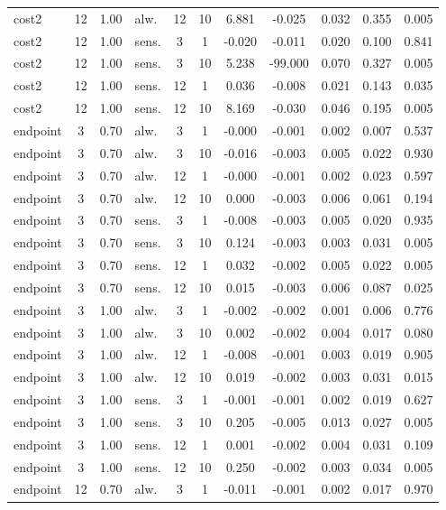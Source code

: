 \documentclass[10pt]{article}
\begin{document}
\begin{scriptsize}
\begin{longtable}{l cclcc ccccc}
cost2 & 12 & 1.00 & alw. & 12 & 10 & 6.881 & -0.025 & 0.032 & 0.355 & 0.005 \\
cost2 & 12 & 1.00 & sens. & 3 & 1 & -0.020 & -0.011 & 0.020 & 0.100 & 0.841 \\
cost2 & 12 & 1.00 & sens. & 3 & 10 & 5.238 & -99.000 & 0.070 & 0.327 & 0.005 \\
cost2 & 12 & 1.00 & sens. & 12 & 1 & 0.036 & -0.008 & 0.021 & 0.143 & 0.035 \\
cost2 & 12 & 1.00 & sens. & 12 & 10 & 8.169 & -0.030 & 0.046 & 0.195 & 0.005 \\
endpoint & 3 & 0.70 & alw. & 3 & 1 & -0.000 & -0.001 & 0.002 & 0.007 & 0.537 \\
endpoint & 3 & 0.70 & alw. & 3 & 10 & -0.016 & -0.003 & 0.005 & 0.022 & 0.930 \\
endpoint & 3 & 0.70 & alw. & 12 & 1 & -0.000 & -0.001 & 0.002 & 0.023 & 0.597 \\
endpoint & 3 & 0.70 & alw. & 12 & 10 & 0.000 & -0.003 & 0.006 & 0.061 & 0.194 \\
endpoint & 3 & 0.70 & sens. & 3 & 1 & -0.008 & -0.003 & 0.005 & 0.020 & 0.935 \\
endpoint & 3 & 0.70 & sens. & 3 & 10 & 0.124 & -0.003 & 0.003 & 0.031 & 0.005 \\
endpoint & 3 & 0.70 & sens. & 12 & 1 & 0.032 & -0.002 & 0.005 & 0.022 & 0.005 \\
endpoint & 3 & 0.70 & sens. & 12 & 10 & 0.015 & -0.003 & 0.006 & 0.087 & 0.025 \\
endpoint & 3 & 1.00 & alw. & 3 & 1 & -0.002 & -0.002 & 0.001 & 0.006 & 0.776 \\
endpoint & 3 & 1.00 & alw. & 3 & 10 & 0.002 & -0.002 & 0.004 & 0.017 & 0.080 \\
endpoint & 3 & 1.00 & alw. & 12 & 1 & -0.008 & -0.001 & 0.003 & 0.019 & 0.905 \\
endpoint & 3 & 1.00 & alw. & 12 & 10 & 0.019 & -0.002 & 0.003 & 0.031 & 0.015 \\
endpoint & 3 & 1.00 & sens. & 3 & 1 & -0.001 & -0.001 & 0.002 & 0.019 & 0.627 \\
endpoint & 3 & 1.00 & sens. & 3 & 10 & 0.205 & -0.005 & 0.013 & 0.027 & 0.005 \\
endpoint & 3 & 1.00 & sens. & 12 & 1 & 0.001 & -0.002 & 0.004 & 0.031 & 0.109 \\
endpoint & 3 & 1.00 & sens. & 12 & 10 & 0.250 & -0.002 & 0.003 & 0.034 & 0.005 \\
endpoint & 12 & 0.70 & alw. & 3 & 1 & -0.011 & -0.001 & 0.002 & 0.017 & 0.970 \\

\end{longtable}
\end{scriptsize}
\end{document}
